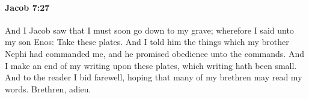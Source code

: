 		\paragraph{Jacob 7:27} %
			\label{JACOB-7-27}

			And I Jacob saw that I must soon go down to my grave;
			wherefore I said unto my son Enos:
			Take these plates.
			And I told him the things which my brother Nephi had commanded me,
			and he promised obedience unto the commands.
			And I make an end of my writing upon these plates,
			which writing hath been small.
			And to the reader I bid farewell,
			hoping that many of my brethren may read my words.
			Brethren, adieu.